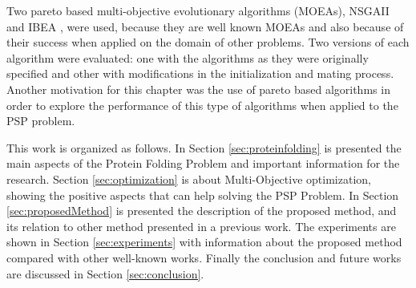 
  
Two pareto based multi-objective evolutionary algorithms (MOEAs), NSGAII \cite{deb2002fast} and IBEA \cite{zitzler2004indicator}, were used, because they are well known MOEAs \cite{CoelloCoello2007} and also because of their success when applied on the domain of other problems. Two versions of each algorithm were evaluated: one with the algorithms as they were originally specified and other with modifications in the initialization and mating process. Another motivation for this chapter was the use of pareto based algorithms in order to explore the performance of this type of algorithms when applied to the PSP problem. 

   


 
 
 
 
 

This work is organized as follows. In Section \ref{sec:proteinfolding} is presented the main aspects of the Protein Folding Problem and important information for the research. Section \ref{sec:optimization} is about Multi-Objective optimization, showing the positive aspects that can help solving the PSP Problem. In Section \ref{sec:proposedMethod} is presented the description of the proposed method, and its relation to other method presented in a previous work. The experiments are shown in Section \ref{sec:experiments} with information about the proposed method compared with other well-known works. Finally the conclusion and future works are discussed in Section \ref{sec:conclusion}.


